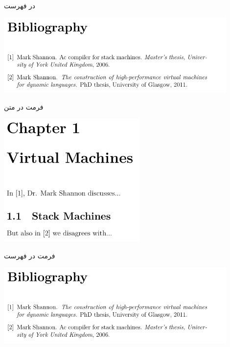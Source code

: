 \begin{frame}{در فهرست}
\begin{center}
\includegraphics[width=0.9\textwidth, height=0.5\textheight]{docs/images/plain-2}
\end{center}
\end{frame}

\begin{frame}{فرمت  در متن}
\begin{center}
\includegraphics[width=0.55\textwidth, height=0.7\textheight]{docs/images/unsrt-1}
\end{center}
\end{frame}

\begin{frame}{فرمت  در فهرست}
\begin{center}
\includegraphics[width=0.9\textwidth, height=0.5\textheight]{docs/images/unsrt-2}
\end{center}
\end{frame}

